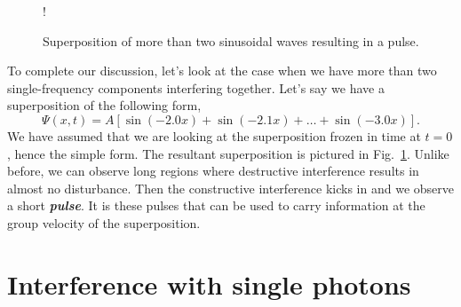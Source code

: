 \begin{figure}[t]
    \centering
    \resizebox {0.9\textwidth} {!} {
    }   
    \caption[Superposition of more than two waves.]{Superposition of more than two sinusoidal waves resulting in a pulse.}
    \label{fig:6-2_pulse}
\end{figure}
To complete our discussion, let's look at the case when we have more than two single-frequency components interfering together.
Let's say we have a superposition of the following form,
\begin{equation}
    \Psi(x,t) = A [\sin(-2.0x) + \sin(-2.1x) + \ldots + \sin(-3.0x)].
    \label{eq:6-2_pulse}
\end{equation}
We have assumed that we are looking at the superposition frozen in time at $t=0$, hence the simple form.
The resultant superposition is pictured in Fig.~\ref{fig:6-2_pulse}.
Unlike before, we can observe long regions where destructive interference results in almost no disturbance.
Then the constructive interference kicks in and we observe a short \textbf{\emph{pulse}}.
It is these pulses that can be used to carry information at the group velocity of the superposition.


\section{Interference with single photons}
\label{sec:6-4_interference_single_photons}

